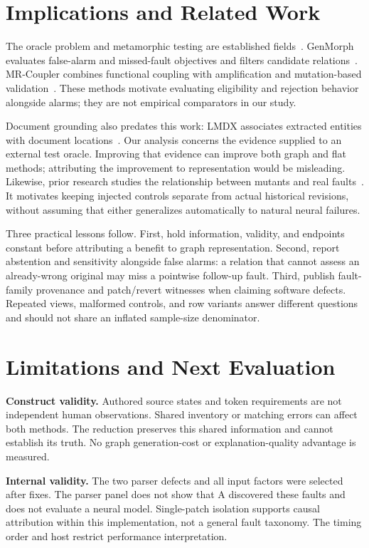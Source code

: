 \documentclass[sigconf,review,anonymous]{acmart}
\begin{document}
\section{Implications and Related Work}
The oracle problem and metamorphic testing are established fields~\cite{barr2015oracle,segura2016survey}. GenMorph evaluates false-alarm and missed-fault objectives and filters candidate relations~\cite{ayerdi2024genmorph}. MR-Coupler combines functional coupling with amplification and mutation-based validation~\cite{xu2026mrcoupler}. These methods motivate evaluating eligibility and rejection behavior alongside alarms; they are not empirical comparators in our study.

Document grounding also predates this work: LMDX associates extracted entities with document locations~\cite{perot2024lmdx}. Our analysis concerns the evidence supplied to an external test oracle. Improving that evidence can improve both graph and flat methods; attributing the improvement to representation would be misleading. Likewise, prior research studies the relationship between mutants and real faults~\cite{just2014mutants}. It motivates keeping injected controls separate from actual historical revisions, without assuming that either generalizes automatically to natural neural failures.

Three practical lessons follow. First, hold information, validity, and endpoints constant before attributing a benefit to graph representation. Second, report abstention and sensitivity alongside false alarms: a relation that cannot assess an already-wrong original may miss a pointwise follow-up fault. Third, publish fault-family provenance and patch/revert witnesses when claiming software defects. Repeated views, malformed controls, and row variants answer different questions and should not share an inflated sample-size denominator.

\balance
\section{Limitations and Next Evaluation}
\textbf{Construct validity.} Authored source states and token requirements are not independent human observations. Shared inventory or matching errors can affect both methods. The reduction preserves this shared information and cannot establish its truth. No graph generation-cost or explanation-quality advantage is measured.

\textbf{Internal validity.} The two parser defects and all input factors were selected after fixes. The parser panel does not show that A discovered these faults and does not evaluate a neural model. Single-patch isolation supports causal attribution within this implementation, not a general fault taxonomy. The timing order and host restrict performance interpretation.
\end{document}
